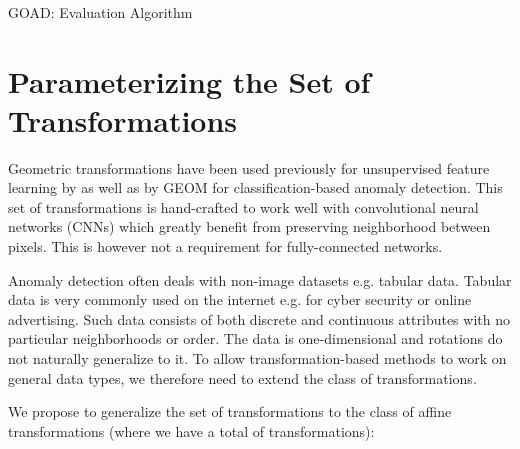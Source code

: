 \documentclass{article} \usepackage{iclr2020_conference,times}
\begin{document}
\begin{algorithm}[H]
\SetAlgoLined
{}
\hspace*{\algorithmicindent}
\hspace*{\algorithmicindent}
\hspace*{\algorithmicindent}  \\ 
\hspace*{\algorithmicindent}  \\ 
\hspace*{\algorithmicindent}\\


\caption{GOAD: Evaluation Algorithm}

\label{alg:goad_train}
\end{algorithm}

\section{Parameterizing the Set of Transformations}
\label{sec:transforms}

Geometric transformations have been used previously for unsupervised feature learning by \cite{gidaris2018unsupervised} as well as by GEOM \citep{golan2018deep} for classification-based anomaly detection. This set of transformations is hand-crafted to work well with convolutional neural networks (CNNs) which greatly benefit from preserving neighborhood between pixels. This is however not a requirement for fully-connected networks.

Anomaly detection often deals with non-image datasets e.g. tabular data. Tabular data is very commonly used on the internet e.g. for cyber security or online advertising. Such data consists of both discrete and continuous attributes with no particular neighborhoods or order. The data is one-dimensional and rotations do not naturally generalize to it. To allow transformation-based methods to work on general data types, we therefore need to extend the class of transformations.

We propose to generalize the set of transformations to the class of affine transformations (where we have a total of  transformations): 
\end{document}

